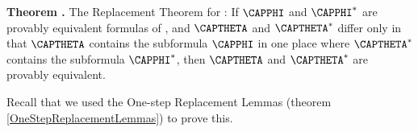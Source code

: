 \begin{majorILnc}{\textbf{Theorem .} The Replacement Theorem for \GQD{}:}
If $\CAPPHI$ and $\CAPPHI^*$ are provably equivalent formulas of \GQL{}, and $\CAPTHETA$ and $\CAPTHETA^*$ differ only in that $\CAPTHETA$ contains the subformula $\CAPPHI$ in one place where $\CAPTHETA^*$ contains the subformula $\CAPPHI^*$, then $\CAPTHETA$ and $\CAPTHETA^*$ are provably equivalent.
\end{majorILnc}

\noindent{}Recall that we used the One-step Replacement Lemmas (theorem \ref{OneStepReplacementLemmas}) to prove this.

